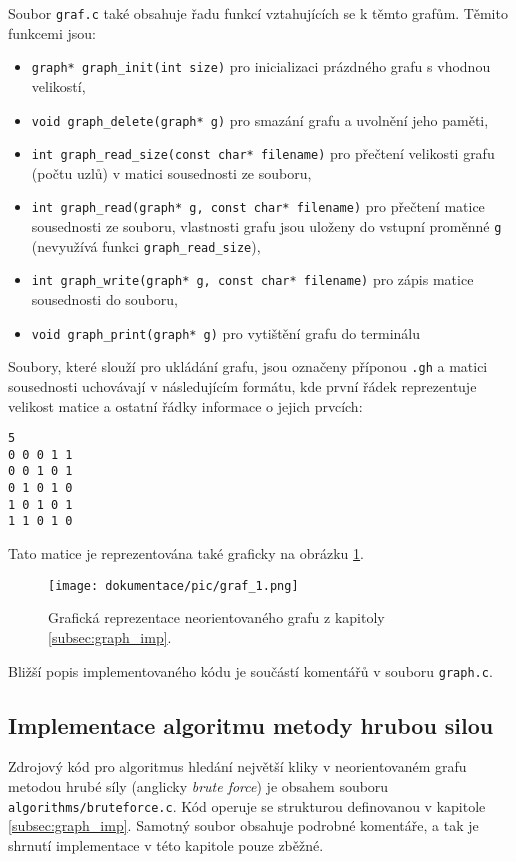 \documentclass[a4paper]{article}
\begin{document}
        \noindent
        Soubor \lstinline{graf.c} také obsahuje řadu funkcí vztahujících se k těmto grafům. Těmito funkcemi jsou:
        \begin{itemize}
            \item \lstinline{graph* graph_init(int size)} pro inicializaci prázdného grafu s vhodnou velikostí,
            \item \lstinline{void graph_delete(graph* g)} pro smazání grafu a uvolnění jeho paměti,
            \item \lstinline{int graph_read_size(const char* filename)} pro přečtení velikosti grafu (počtu uzlů) v matici sousednosti ze souboru,
            \item \lstinline{int graph_read(graph* g, const char* filename)} pro přečtení matice sousednosti ze souboru, vlastnosti grafu jsou uloženy do vstupní proměnné \lstinline{g} (nevyužívá funkci \lstinline{graph_read_size}),
            \item \lstinline{int graph_write(graph* g, const char* filename)} pro zápis matice sousednosti do souboru,
            \item \lstinline{void graph_print(graph* g)} pro vytištění grafu do terminálu
        \end{itemize}

        \noindent
        Soubory, které slouží pro ukládání grafu, jsou označeny příponou \lstinline{.gh} a matici sousednosti uchovávají v následujícím formátu, kde první řádek reprezentuje velikost matice a ostatní řádky informace o jejich prvcích:
        \begin{lstlisting}[caption={Zápis matice v \lstinline{.gh} souboru.},captionpos=b,label={code:zapis_matice}]
5
0 0 0 1 1
0 0 1 0 1
0 1 0 1 0
1 0 1 0 1
1 1 0 1 0
        \end{lstlisting}
        Tato matice je reprezentována také graficky na obrázku \ref{fig:graf1}.
        \begin{figure}[bh]
            \centering
            \texttt{[image: dokumentace/pic/graf\_1.png]}
            \caption{Grafická reprezentace neorientovaného grafu z kapitoly \ref{subsec:graph_imp}.}
            \label{fig:graf1}
        \end{figure}

        \noindent
        Bližší popis implementovaného kódu je součástí komentářů v souboru \lstinline{graph.c}.

    \subsection{Implementace algoritmu metody hrubou silou}
        Zdrojový kód pro algoritmus hledání největší kliky v neorientovaném grafu metodou hrubé síly (anglicky \textit{brute force}) je obsahem souboru \lstinline{algorithms/bruteforce.c}. Kód operuje se strukturou definovanou v kapitole \ref{subsec:graph_imp}. Samotný soubor obsahuje podrobné komentáře, a tak je shrnutí implementace v této kapitole pouze zběžné.\\
\end{document}
